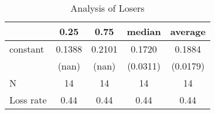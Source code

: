 \begin{table}
\caption{Analysis of Losers}
\begin{center}
\begin{tabular}{lcccc}
\hline
          &  0.25  &  0.75  &  median  & average   \\
\midrule
\midrule
constant  & 0.1388 & 0.2101 & 0.1720   & 0.1884    \\
          & (nan)  & (nan)  & (0.0311) & (0.0179)  \\
N         & 14     & 14     & 14       & 14        \\
Loss rate & 0.44   & 0.44   & 0.44     & 0.44      \\
\hline
\end{tabular}
\end{center}
\end{table}